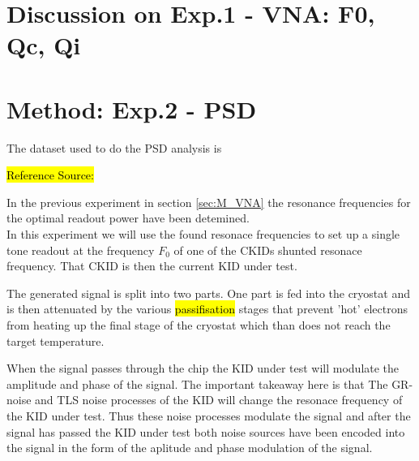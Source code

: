 \section{Discussion on Exp.1 - VNA: F0, Qc, Qi}
\section{Method: Exp.2 - PSD}



The dataset used to do the PSD analysis is 


\hl{Reference Source:}

In the previous experiment in section \ref{sec:M_VNA} the resonance frequencies for the optimal readout power have been detemined.\\ 

In this experiment we will use the found resonace frequencies to set up a single tone readout at the frequency $F_0$ of one of the CKIDs shunted resonace frequency. That CKID is then the current KID under test. 

The generated signal is split into two parts. One part is fed into the cryostat and is then attenuated by the various \hl{passifisation} stages that prevent 'hot' electrons from heating up the final stage of the cryostat which than does not reach the target temperature.

When the signal passes through the chip the KID under test will modulate the amplitude and phase of the signal. The important takeaway here is that The GR-noise and TLS noise processes of the KID will change the resonace frequency of the KID under test. Thus these noise processes modulate the signal and after the signal has passed the KID under test both noise sources have been encoded into the signal in the form of the aplitude and phase modulation of the signal.

